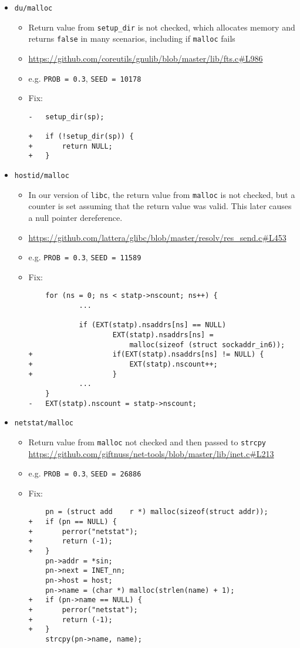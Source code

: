 \begin{itemize}

\item \texttt{du/malloc}
\begin{itemize}
\item Return value from \texttt{setup\_dir} is not checked, which allocates memory and returns \texttt{false} in many scenarios, including if \texttt{malloc} fails
\item \url{https://github.com/coreutils/gnulib/blob/master/lib/fts.c#L986}
\item e.g. \texttt{PROB = 0.3}, \texttt{SEED = 10178}
\item Fix:
\begin{lstlisting}
-	setup_dir(sp);

+	if (!setup_dir(sp)) {
+		return NULL;
+	}
\end{lstlisting}
\end{itemize}

\item \texttt{hostid/malloc}
\begin{itemize}
\item In our version of \texttt{libc}, the return value from \texttt{malloc} is not checked, but a counter is set assuming that the return value was valid. This later causes a null pointer dereference.
\item \url{https://github.com/lattera/glibc/blob/master/resolv/res_send.c#L453}
\item e.g. \texttt{PROB = 0.3}, \texttt{SEED = 11589}
\item Fix:
\begin{lstlisting}
	for (ns = 0; ns < statp->nscount; ns++) {
			...
			
	        if (EXT(statp).nsaddrs[ns] == NULL)
	                EXT(statp).nsaddrs[ns] =
	                    malloc(sizeof (struct sockaddr_in6));
+	                if(EXT(statp).nsaddrs[ns] != NULL) {
+	                	EXT(statp).nscount++;
+	                }
			...
	}
-	EXT(statp).nscount = statp->nscount;
\end{lstlisting}
\end{itemize}

\item \texttt{netstat/malloc}
\begin{itemize}
\item Return value from \texttt{malloc} not checked and then passed to \texttt{strcpy}
\url{https://github.com/giftnuss/net-tools/blob/master/lib/inet.c#L213}
\item e.g. \texttt{PROB = 0.3}, \texttt{SEED = 26886}
\item Fix:
\begin{lstlisting}
    pn = (struct add	r *) malloc(sizeof(struct addr));
+   if (pn == NULL) {
+   	perror("netstat");
+		return (-1);
+   }
    pn->addr = *sin;
    pn->next = INET_nn;
    pn->host = host;
    pn->name = (char *) malloc(strlen(name) + 1);
+   if (pn->name == NULL) {
+   	perror("netstat");
+		return (-1);
+   }
    strcpy(pn->name, name);

\end{lstlisting}
\end{itemize}

\end{itemize}
